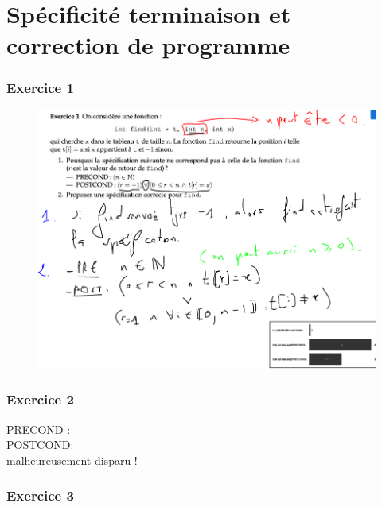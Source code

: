 \documentclass[a4paper]{article}
\begin{document}
\part*{Spécificité terminaison et correction de programme}
\section*{Exercice 1}
\begin{figure}[!h]
  \centering
  \includegraphics[scale=0.60]{ex1_td5}
\end{figure}
\section*{Exercice 2}
PRECOND :\\

POSTCOND:\\
malheureusement disparu !

\clearpage
\section*{Exercice 3}
\end{document}
